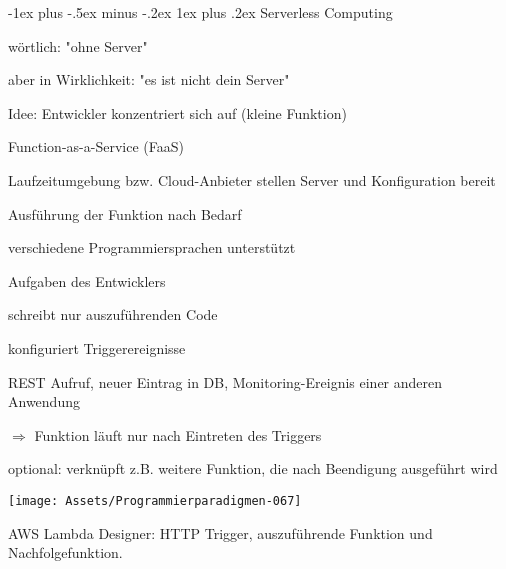 \documentclass[10pt]{article}
\makeatletter
\renewcommand{\subsubsection}{\@startsection{subsubsection}{3}{0mm}%
                                {-1ex plus -.5ex minus -.2ex}%
                                {1ex plus .2ex}%
                                {\normalfont\small\bfseries}}
\makeatother
\begin{document}
\begin{itemize*}
\subsubsection{Serverless Computing}
\begin{itemize*}
  \item wörtlich: "ohne Server"
  \begin{itemize*}
    \item aber in Wirklichkeit: "es ist nicht dein Server"
    \item Idee: Entwickler konzentriert sich auf (kleine Funktion)
    \begin{itemize*}
      \item Function-as-a-Service (FaaS)
    \end{itemize*}
    \item Laufzeitumgebung bzw. Cloud-Anbieter stellen Server und Konfiguration bereit
    \item Ausführung der Funktion nach Bedarf
    \item verschiedene Programmiersprachen unterstützt
  \end{itemize*}
\end{itemize*}
Aufgaben des Entwicklers
\begin{itemize*}
  \item schreibt nur auszuführenden Code
  \item konfiguriert Triggerereignisse
  \begin{itemize*}
    \item REST Aufruf, neuer Eintrag in DB, Monitoring-Ereignis einer anderen Anwendung
    \item $\Rightarrow$ Funktion läuft nur nach Eintreten des Triggers
    \item optional: verknüpft z.B. weitere Funktion, die nach Beendigung ausgeführt wird
  \end{itemize*}
\end{itemize*}
\begin{center}
  \centering
  \texttt{[image: Assets/Programmierparadigmen-067]}
\end{center}
AWS Lambda Designer: HTTP Trigger, auszuführende Funktion und Nachfolgefunktion.

\end{itemize*}
\end{document}
